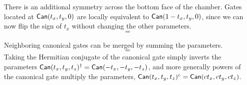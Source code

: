 
There is an additional symmetry across the bottom face of the chamber. Gates located at $\Gate{Can}(t_x, t_y, 0)$ are locally equivalent to $\Gate{Can}(1-t_x, t_y, 0)$, since we can now flip the sign of $t_x$ without changing the other parameters.
$$

= 
 
$$

%
 Neighboring canonical gates can be merged by summing the parameters. 
$$

= 

$$
Taking the Hermitian conjugate of the canonical gate simply inverts the parameters $\Gate{Can}(t_x, t_y, t_z)^\dagger  = \Gate{Can}(-t_x, -t_y, -t_z)$, and more generally powers of the canonical gate multiply the parameters, $\Gate{Can}(t_x, t_y, t_z)^c = \Gate{Can}(c t_x, c t_y, c t_z)$.



